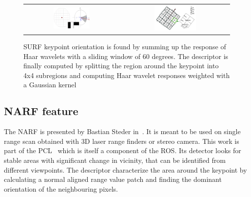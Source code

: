 \begin{figure}[H]
\centering
 \begin{tabular}{cc}
 \includegraphics[width=0.4\textwidth]{figures/surf_orientation} &
 \includegraphics[width=0.4\textwidth]{figures/surf_descriptor}
\end{tabular}
\caption{SURF keypoint orientation is found by summing up the response of Haar wavelets with a sliding window of 60 degrees. The descriptor is finally computed by splitting the region around the keypoint into 4x4 subregions and computing Haar wavelet responses weighted with a Gaussian kernel}
\end{figure}

\subsection{NARF feature}

The \gls{NARF} is presented by Bastian Steder in~\cite{steder10irosws}. It is meant to be used on single range scan obtained with 3D laser range finders or stereo camera. This work is part of the \gls{PCL}~\cite{Rusu_ICRA2011_PCL} which is itself a component of the \gls{ROS}. Its detector looks for stable areas with significant change in vicinity, that can be identified from different viewpoints. The descriptor characterize the area around the keypoint by calculating a normal aligned range value patch and finding the dominant orientation of the neighbouring pixels.

